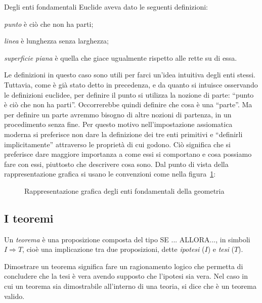 Degli enti fondamentali Euclide aveva dato le seguenti definizioni:
\begin{itemize*}
\item \emph{punto} è ciò che non ha parti;
\item \emph{linea} è lunghezza senza larghezza;
\item \emph{superficie piana} è quella che giace ugualmente rispetto 
alle rette su di essa.
\end{itemize*}
Le definizioni in questo caso sono utili per farci un'idea intuitiva 
degli enti stessi. Tuttavia, come è già stato detto in precedenza, e 
da quanto si intuisce osservando le definizioni euclidee, per 
definire il punto si utilizza la nozione di parte: ``punto è ciò che 
non ha parti''. Occorrerebbe quindi definire che cosa è una 
``parte''. Ma per definire un parte avremmo bisogno di altre nozioni 
di partenza, in un procedimento senza fine. Per questo motivo 
nell'impostazione assiomatica moderna si preferisce non dare la 
definizione dei tre enti primitivi e ``definirli implicitamente'' 
attraverso le proprietà di cui godono. Ciò significa che si 
preferisce dare maggiore importanza a come essi si comportano e cosa 
possiamo fare con essi, piuttosto che descrivere cosa sono.
Dal punto di vista della rappresentazione grafica si usano le 
convenzioni come nella figura~\ref{fig:1.2}:
% 

\begin{inaccessibleblock}
 \begin{figure}[htb]
 \centering
 \caption{Rappresentazione grafica degli enti fondamentali della 
geometria}\label{fig:1.2}
\end{figure}
\end{inaccessibleblock}

\vspazio\ovalbox{\risolvi \ref{ese:1.32}}


\subsection{I teoremi}

Un \emph{teorema} è una proposizione composta del tipo SE ... ALLORA..., in simboli $I\Rightarrow 
T$, cioè una implicazione tra due proposizioni, dette \emph{ipotesi} 
($I$) e \emph{tesi} ($T$).

Dimostrare un teorema significa fare un ragionamento logico che 
permetta di concludere che la tesi è vera avendo supposto che 
l'ipotesi sia vera. Nel caso in cui un teorema sia dimostrabile 
all'interno di una teoria, si dice che è un teorema valido.

